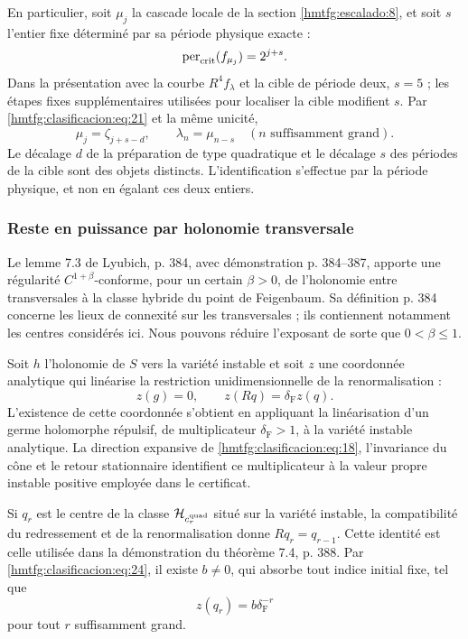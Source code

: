 En particulier, soit \(\mu_j\) la cascade locale de la section \ref{hmtfg:escalado:8}, et soit \(s\) l’entier fixe déterminé par sa période physique exacte :
\[
\operatorname{per}_{\rm crit}(f_{\mu_j})=2^{j+s}.
\]
Dans la présentation avec la courbe \(R^4f_\lambda\) et la cible de période deux, \(s=5\) ; les étapes fixes supplémentaires utilisées pour localiser la cible modifient \(s\). Par \eqref{hmtfg:clasificacion:eq:21} et la même unicité,
\begin{equation}
\mu_j=\zeta_{j+s-d},\qquad
\boxed{\lambda_n=\mu_{n-s}\quad(n\text{ suffisamment grand}).}
\label{hmtfg:clasificacion:eq:23}
\end{equation}
Le décalage \(d\) de la préparation de type quadratique et le décalage \(s\) des périodes de la cible sont des objets distincts. L’identification s’effectue par la période physique, et non en égalant ces deux entiers.

\subsubsection{Reste en puissance par holonomie transversale}
\label{hmtfg:clasificacion:8.4}

Le lemme 7.3 de Lyubich, p. 384, avec démonstration p. 384–387, apporte une régularité \(C^{1+\beta}\)-conforme, pour un certain \(\beta>0\), de l’holonomie entre transversales à la classe hybride du point de Feigenbaum. Sa définition p. 384 concerne les lieux de connexité sur les transversales ; ils contiennent notamment les centres considérés ici. Nous pouvons réduire l’exposant de sorte que \(0<\beta\le1\).

Soit \(h\) l’holonomie de \(S\) vers la variété instable et soit \(z\) une coordonnée analytique qui linéarise la restriction unidimensionnelle de la renormalisation :
\begin{equation}
z(g)=0,\qquad z(Rq)=\delta_{\mathrm F} z(q).
\label{hmtfg:clasificacion:eq:24}
\end{equation}
L’existence de cette coordonnée s’obtient en appliquant la linéarisation d’un germe holomorphe répulsif, de multiplicateur \(\delta_{\mathrm F}>1\), à la variété instable analytique. La direction expansive de \eqref{hmtfg:clasificacion:eq:18}, l’invariance du cône et le retour stationnaire identifient ce multiplicateur à la valeur propre instable positive employée dans le certificat.

Si \(q_r\) est le centre de la classe \(\mathcal H_{c_r^{\rm quad}}\) situé sur la variété instable, la compatibilité du redressement et de la renormalisation donne \(Rq_r=q_{r-1}\). Cette identité est celle utilisée dans la démonstration du théorème 7.4, p. 388. Par \eqref{hmtfg:clasificacion:eq:24}, il existe \(b\ne0\), qui absorbe tout indice initial fixe, tel que
\begin{equation}
z(q_r)=b\delta_{\mathrm F}^{-r}
\label{hmtfg:clasificacion:eq:25}
\end{equation}
pour tout \(r\) suffisamment grand.

